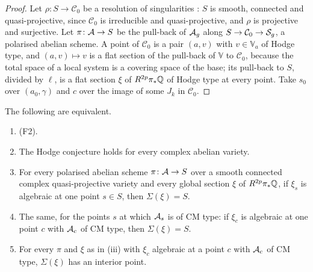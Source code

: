 \begin{proof}
Let $\rho\colon S\to\mathcal{C}_{0}$ be a resolution of singularities
\cite{Hir64}: $S$ is smooth, connected and quasi-projective, since
$\mathcal{C}_{0}$ is irreducible and quasi-projective, and $\rho$ is
projective and surjective. Let $\pi\colon\mathcal{A}\to S$ be the pull-back of
$\mathcal{A}_{g}$ along $S\to\mathcal{C}_{0}\to\mathcal{S}_{g}$, a polarised abelian scheme.
A point of $\mathcal{C}_{0}$ is a pair $(a,v)$ with $v\in\mathbb{V}_{a}$ of
Hodge type, and $(a,v)\mapsto v$ is a flat section of the pull-back of
$\mathbb{V}$ to $\mathcal{C}_{0}$, because the total space of a local system
is a covering space of the base; its pull-back to $S$, divided by $\ell$, is
a flat section $\xi$ of $R^{2p}\pi_{*}\mathbb{Q}$ of Hodge type at every point.
Take $s_{0}$ over $(a_{0},\gamma)$ and $c$ over the image of some $J_{k}$ in
$\mathcal{C}_{0}$.
\end{proof}

\begin{theorem}\label{thm:f2propagation}
The following are equivalent.
\begin{enumerate}[label=\textup{(\roman*)},leftmargin=2.6em,itemsep=2pt]
\item \textup{(F2)}.
\item The Hodge conjecture holds for every complex abelian variety.
\item For every polarised abelian scheme $\pi\colon\mathcal{A}\to S$ over a smooth
  connected complex quasi-projective variety and every global section $\xi$
  of $R^{2p}\pi_{*}\mathbb{Q}$, if $\xi_{s}$ is algebraic at one point $s\in S$,
  then $\Sigma(\xi)=S$.
\item The same, for the points $s$ at which $\mathcal{A}_{s}$ is of CM type: if
  $\xi_{c}$ is algebraic at one point $c$ with $\mathcal{A}_{c}$ of CM type, then
  $\Sigma(\xi)=S$.
\item For every $\pi$ and $\xi$ as in \textup{(iii)} with $\xi_{c}$ algebraic
  at a point $c$ with $\mathcal{A}_{c}$ of CM type, $\Sigma(\xi)$ has an interior
  point.
\end{enumerate}
\end{theorem}

